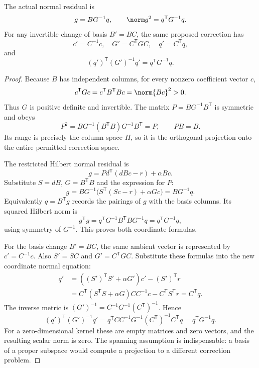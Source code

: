 \begin{proposition}\label{WR15}
The actual normal residual is
\begin{equation}\label{eq:covector-norm}
 g=BG^{-1}q,\qquad \norm g^2=q^{\mathsf T}G^{-1}q.
\end{equation}
For any invertible change of basis $B'=BC$, the same proposed correction has
\[
 c'=C^{-1}c,\quad G'=C^{\mathsf T}GC,\quad q'=C^{\mathsf T}q,
\]
and
\[
 (q')^{\mathsf T}(G')^{-1}q'=q^{\mathsf T}G^{-1}q.
\]
\end{proposition}
\begin{proof}
Because $B$ has independent columns, for every nonzero coefficient vector $c$,
\[
 c^{\mathsf T}Gc=c^{\mathsf T}B^{\mathsf T}Bc=\norm{Bc}^2>0.
\]
Thus $G$ is positive definite and invertible. The matrix $P=BG^{-1}B^{\mathsf T}$ is symmetric and obeys
\[
 P^2=BG^{-1}(B^{\mathsf T}B)G^{-1}B^{\mathsf T}=P,
 \qquad PB=B.
\]
Its range is precisely the column space $H$, so it is the orthogonal projection onto the entire permitted correction space.

The restricted Hilbert normal residual is
\[
 g=P d^{\mathsf T}(dBc-r)+\alpha Bc.
\]
Substitute $S=dB$, $G=B^{\mathsf T}B$ and the expression for $P$:
\[
 g=BG^{-1}\bigl(S^{\mathsf T}(Sc-r)+\alpha Gc\bigr)=BG^{-1}q.
\]
Equivalently $q=B^{\mathsf T}g$ records the pairings of $g$ with the basis columns. Its squared Hilbert norm is
\[
 g^{\mathsf T}g
 =q^{\mathsf T}G^{-1}B^{\mathsf T}BG^{-1}q
 =q^{\mathsf T}G^{-1}q,
\]
using symmetry of $G^{-1}$. This proves both coordinate formulas.

For the basis change $B'=BC$, the same ambient vector is represented by $c'=C^{-1}c$. Also $S'=SC$ and $G'=C^{\mathsf T}GC$. Substitute these formulas into the new coordinate normal equation:
\[
\begin{aligned}
 q'&=((S')^{\mathsf T}S'+\alpha G')c'-(S')^{\mathsf T}r\\
 &=C^{\mathsf T}(S^{\mathsf T}S+\alpha G)CC^{-1}c
      -C^{\mathsf T}S^{\mathsf T}r=C^{\mathsf T}q.
\end{aligned}
\]
The inverse metric is $(G')^{-1}=C^{-1}G^{-1}(C^{\mathsf T})^{-1}$. Hence
\[
 (q')^{\mathsf T}(G')^{-1}q'
 =q^{\mathsf T}C C^{-1}G^{-1}(C^{\mathsf T})^{-1}C^{\mathsf T}q
 =q^{\mathsf T}G^{-1}q.
\]
For a zero-dimensional kernel these are empty matrices and zero vectors, and the resulting scalar norm is zero. The spanning assumption is indispensable: a basis of a proper subspace would compute a projection to a different correction problem.
\end{proof}

